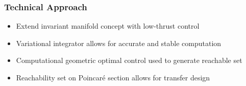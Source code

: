 %	

\begin{frame} %
\frametitle{Technical Approach}
		\begin{itemize}
			\item Extend invariant manifold concept with low-thrust control  
			\item Variational integrator allows for accurate and stable computation
			\item Computational geometric optimal control used to generate reachable set
			\item Reachability set on Poincar\'e section allows for transfer design
		\end{itemize}
\end{frame} %
